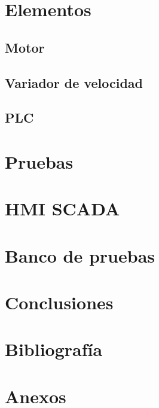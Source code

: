 \documentclass[12pt,a4paper]{article}
\begin{document}
\section{Elementos}
\subsection{Motor}


\subsection{Variador de velocidad}

	
\subsection{PLC}

	
\section{Pruebas}


\section{HMI SCADA}


\section{Banco de pruebas}





\section{Conclusiones}


\section{Bibliografía}

\section{Anexos}

\end{document}
